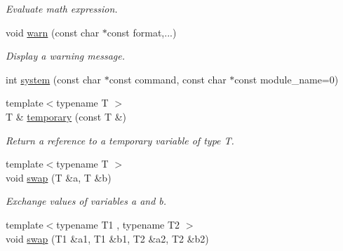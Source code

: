 \begin{DoxyCompactItemize}
\begin{DoxyCompactList}\small\item\em Evaluate math expression. \item\end{DoxyCompactList}\item 
void \hyperlink{namespacecimg__library_1_1cimg_a5ee7f021ed42b0ac32e1254414c3faab}{warn} (const char $\ast$const format,...)
\begin{DoxyCompactList}\small\item\em Display a warning message. \item\end{DoxyCompactList}\item 
int \hyperlink{namespacecimg__library_1_1cimg_a09e80f4d7a95f3d5c2282202d8526520}{system} (const char $\ast$const command, const char $\ast$const module\_\-name=0)
\item 
\hypertarget{namespacecimg__library_1_1cimg_af3bb87016460121409a8f1a2ebe418b1}{
{\footnotesize template$<$typename T $>$ }\\T \& \hyperlink{namespacecimg__library_1_1cimg_af3bb87016460121409a8f1a2ebe418b1}{temporary} (const T \&)}
\label{namespacecimg__library_1_1cimg_af3bb87016460121409a8f1a2ebe418b1}

\begin{DoxyCompactList}\small\item\em Return a reference to a temporary variable of type T. \item\end{DoxyCompactList}\item 
\hypertarget{namespacecimg__library_1_1cimg_a998ee77cc062d63b4faa62eb659e6e9a}{
{\footnotesize template$<$typename T $>$ }\\void \hyperlink{namespacecimg__library_1_1cimg_a998ee77cc062d63b4faa62eb659e6e9a}{swap} (T \&a, T \&b)}
\label{namespacecimg__library_1_1cimg_a998ee77cc062d63b4faa62eb659e6e9a}

\begin{DoxyCompactList}\small\item\em Exchange values of variables {\ttfamily a} and {\ttfamily b}. \item\end{DoxyCompactList}\item 
\hypertarget{namespacecimg__library_1_1cimg_a2b733fa20def6d955d5f3b1a742b2a0e}{
{\footnotesize template$<$typename T1 , typename T2 $>$ }\\void \hyperlink{namespacecimg__library_1_1cimg_a2b733fa20def6d955d5f3b1a742b2a0e}{swap} (T1 \&a1, T1 \&b1, T2 \&a2, T2 \&b2)}
\label{namespacecimg__library_1_1cimg_a2b733fa20def6d955d5f3b1a742b2a0e}


\end{DoxyCompactItemize}
